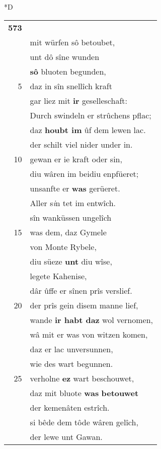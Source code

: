 \documentclass[8pt,a4paper,notitlepage]{article}
\begin{document}
\begin{table}[ht]
\begin{minipage}[t]{0.5\linewidth}
\small
\begin{center}*D
\end{center}
\begin{tabular}{rl}
\textbf{573} & \textit{\begin{large}N\end{large}}û was im sîn houbet\\ 
 & mit würfen sô betoubet,\\ 
 & unt dô sîne wunden\\ 
 & \textbf{sô} bluoten begunden,\\ 
5 & daz in sîn snellîch kraft\\ 
 & gar liez mit \textbf{ir} geselleschaft:\\ 
 & Durch swindeln er strûchens pflac;\\ 
 & daz \textbf{houbt im} ûf dem lewen lac.\\ 
 & der schilt viel nider under in.\\ 
10 & gewan er ie kraft oder sin,\\ 
 & diu wâren im beidiu enpfüeret;\\ 
 & unsanfte er \textbf{was} gerüeret.\\ 
 & Aller s\textit{i}n tet im entwîch.\\ 
 & sîn wanküssen ungelîch\\ 
15 & was dem, daz Gymele\\ 
 & von Monte Rybele,\\ 
 & diu süeze \textbf{unt} diu wîse,\\ 
 & legete Kahenise,\\ 
 & dâr ûffe er sînen prîs verslief.\\ 
20 & der prîs gein disem manne lief,\\ 
 & wande \textbf{ir habt daz} wol vernomen,\\ 
 & wâ mit er was von witzen komen,\\ 
 & daz er lac unversunnen,\\ 
 & wie des wart begunnen.\\ 
25 & verholne \textbf{ez} wart beschouwet,\\ 
 & daz mit bluote \textbf{was} \textbf{betouwet}\\ 
 & der kemenâten estrîch.\\ 
 & si bêde dem tôde wâren gelîch,\\ 
 & der lewe unt Gawan.\\ 

\end{tabular}
\end{minipage}
\end{table}
\end{document}
